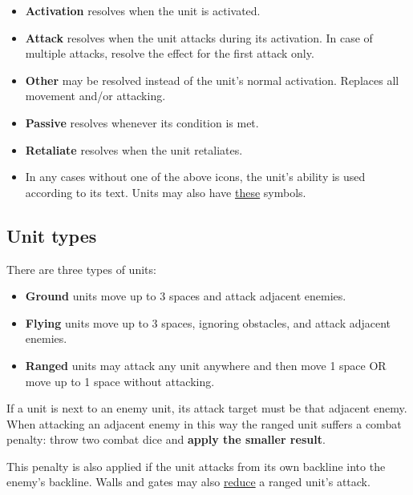 \begin{itemize}[wide]
  \item\textbf{Activation}  resolves when the unit is activated.
  \item\textbf{Attack}  resolves when the unit attacks during its activation.
    In case of multiple attacks, resolve the effect for the first attack only.
  \item\textbf{Other}  may be resolved instead of the unit's normal activation.
    Replaces all movement and/or attacking.
  \item\textbf{Passive}  resolves whenever its condition is met.
  \item\textbf{Retaliate}  resolves when the unit retaliates.
  \item In any cases without one of the above icons, the unit’s ability is used according to its text.
    Units may also have \hyperlink{Playerdecks}{these} symbols.
\end{itemize}

\clearpage
\subsection*{\hypertarget{Unittype}{Unit types}}
There are three types of units:
\begin{itemize}
  \item \textbf{Ground}  units move up to 3 spaces and attack adjacent enemies.
  \item \textbf{Flying}  units move up to 3 spaces, ignoring obstacles, and attack adjacent enemies.
  \item \textbf{Ranged}  units may attack any unit anywhere and then move 1 space OR move up to 1 space without attacking.
\end{itemize}
If a  unit is next to an enemy unit, its attack target must be that adjacent enemy.
When attacking an adjacent enemy in this way the ranged unit suffers a combat penalty: throw two combat dice and \textbf{apply the smaller result}.\par
This penalty is also applied if the  unit attacks from its own backline into the enemy's backline.
Walls and gates may also \hyperlink{Walls}{reduce} a ranged unit's attack.

